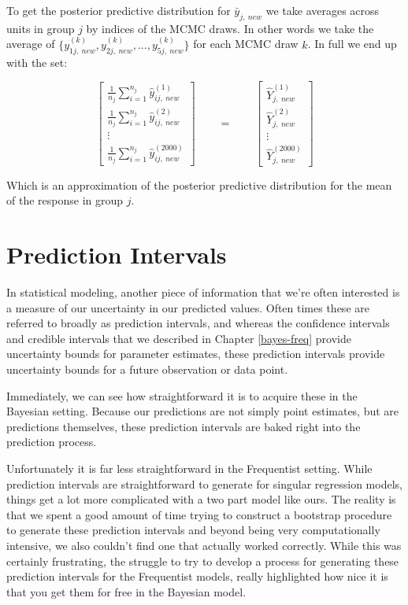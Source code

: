 \documentclass[12pt,twoside]{reedthesis}
\begin{document}
To get the posterior predictive distribution for \(\bar{y}_{j, \ new}\) we take averages across units in group \(j\) by indices of the MCMC draws. In other words we take the average of \(\Big\{y_{1j, \ new}^{(k)}, y_{2j, \ new}^{(k)}, ... , y_{5j, \ new}^{(k)}\Big\}\) for each MCMC draw \(k\). In full we end up with the set:

\[
\begin{bmatrix}
\frac{1}{n_j} \sum_{i = 1}^{n_j}\hat{y}_{ij, \ new}^{(1)} \\
\frac{1}{n_j} \sum_{i = 1}^{n_j}\hat{y}_{ij, \ new}^{(2)} \\
\vdots \\
\frac{1}{n_j} \sum_{i = 1}^{n_j}\hat{y}_{ij, \ new}^{(2000)}
\end{bmatrix} \qquad = \qquad 
\begin{bmatrix}
\hat{Y}_{j, \ new}^{(1)} \\
\hat{Y}_{j, \ new}^{(2)} \\
\vdots \\
\hat{Y}_{j, \ new}^{(2000)}
\end{bmatrix}
\]

Which is an approximation of the posterior predictive distribution for the mean of the response in group \(j\).

\hypertarget{prediction-intervals}{%
\section{Prediction Intervals}\label{prediction-intervals}}

In statistical modeling, another piece of information that we're often interested is a measure of our uncertainty in our predicted values. Often times these are referred to broadly as prediction intervals, and whereas the confidence intervals and credible intervals that we described in Chapter \ref{bayes-freq} provide uncertainty bounds for parameter estimates, these prediction intervals provide uncertainty bounds for a future observation or data point.

Immediately, we can see how straightforward it is to acquire these in the Bayesian setting. Because our predictions are not simply point estimates, but are predictions themselves, these prediction intervals are baked right into the prediction process.

Unfortunately it is far less straightforward in the Frequentist setting. While prediction intervals are straightforward to generate for singular regression models, things get a lot more complicated with a two part model like ours. The reality is that we spent a good amount of time trying to construct a bootstrap procedure to generate these prediction intervals and beyond being very computationally intensive, we also couldn't find one that actually worked correctly. While this was certainly frustrating, the struggle to try to develop a process for generating these prediction intervals for the Frequentist models, really highlighted how nice it is that you get them for free in the Bayesian model.
\end{document}

